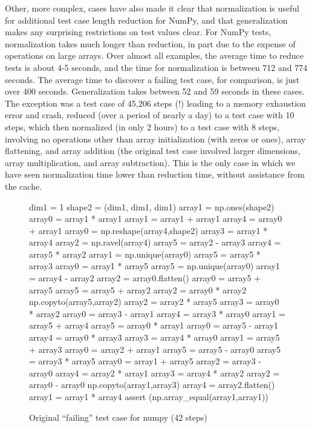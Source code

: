 Other, more complex, cases have also made it clear that normalization
is useful for additional test case length reduction for NumPy, and
that generalization makes any surprising restrictions on test values
clear.  For NumPy tests, normalization takes much longer than
reduction, in part due to the expense of operations on large arrays.
Over almost all examples, the average time to reduce tests is about
4-5 seconds, and the time for normalization is between 712 and 774
seconds.  The average time to discover a failing test case, for
comparison, is just over 400 seconds.  Generalization takes between 52
and 59 seconds in these cases.  The exception was a test case of
45,206 steps (!)  leading to a memory exhaustion error and crash,
reduced (over a period of nearly a day) to a test case with 10 steps,
which then normalized (in only 2 hours) to a test case with 8 steps,
involving no operations other than array initialization (with zeros or
ones), array flattening, and array addition (the original test case
involved larger dimensions, array multiplication, and array
subtraction).  This is the only case in which we have seen
normalization time lower than reduction time, without assistance from
the cache.

\begin{figure}
{\scriptsize
\begin{code}
 dim1 = 1 
 shape2 = (dim1, dim1, dim1) 
 array1 = np.ones(shape2) 
 array0 = array1 * array1 
 array1 = array1 + array1 
 array4 = array0 + array1 
 array0 = np.reshape(array4,shape2) 
 array3 = array1 * array4 
 array2 = np.ravel(array4) 
 array5 = array2 - array3 
 array4 = array5 * array2 
 array1 = np.unique(array0) 
 array5 = array5 * array3 
 array0 = array1 * array5 
 array5 = np.unique(array0) 
 array1 = array4 - array2 
 array2 = array0.flatten() 
 array0 = array5 + array5 
 array5 = array5 + array2 
 array2 = array0 * array2 
 np.copyto(array5,array2) 
 array2 = array2 * array5 
 array3 = array0 * array2 
 array0 = array3 - array1 
 array4 = array3 * array0 
 array1 = array5 + array4 
 array5 = array0 * array1 
 array0 = array5 - array1 
 array4 = array0 * array3 
 array3 = array4 * array0 
 array1 = array5 + array3 
 array0 = array2 + array1 
 array5 = array5 - array0 
 array5 = array3 * array5 
 array0 = array1 + array5 
 array2 = array3 - array0 
 array4 = array2 * array1 
 array3 = array4 * array2 
 array2 = array0 - array0 
 np.copyto(array1,array3) 
 array4 = array2.flatten() 
 array1 = array1 * array4
 assert (np.array\_equal(array1,array1))
\end{code}
}
\caption{Original ``failing'' test case for numpy (42 steps)}
\label{numpyorig}
\end{figure}

